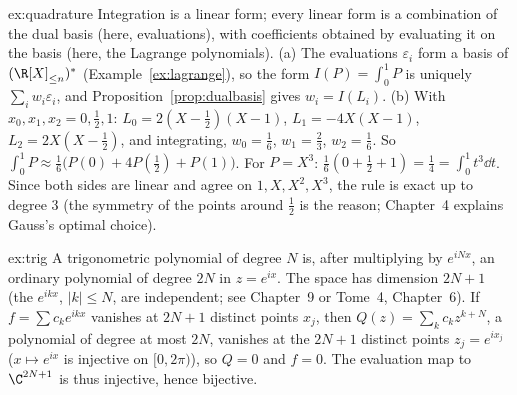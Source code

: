 \begin{solution}{ex:quadrature}
\idea Integration is a linear form; every linear form is a combination of the dual basis (here, evaluations), with
coefficients obtained by evaluating it on the basis (here, the Lagrange polynomials).
\writeup (a) The evaluations $\varepsilon_i$ form a basis of $(\R[X]_{\le n})^*$ (Example~\ref{ex:lagrange}), so the form
$I(P)=\int_0^1P$ is uniquely $\sum_iw_i\varepsilon_i$, and Proposition~\ref{prop:dualbasis} gives $w_i=I(L_i)$.
(b) With $x_0,x_1,x_2=0,\frac12,1$: $L_0=2(X-\frac12)(X-1)$, $L_1=-4X(X-1)$, $L_2=2X(X-\frac12)$, and integrating,
$w_0=\frac16$, $w_1=\frac23$, $w_2=\frac16$. So $\int_0^1P\approx\frac16\bigl(P(0)+4P(\frac12)+P(1)\bigr)$. For $P=X^3$:
$\frac16(0+\frac12+1)=\frac14=\int_0^1t^3\dd t$. Since both sides are linear and agree on $1,X,X^2,X^3$, the rule is exact
up to degree $3$ (the symmetry of the points around $\frac12$ is the reason; Chapter~4 explains Gauss's optimal choice).
\end{solution}

\begin{solution}{ex:trig}
\idea A trigonometric polynomial of degree $N$ is, after multiplying by $e^{iNx}$, an ordinary polynomial of degree $2N$
in $z=e^{ix}$.
\writeup The space has dimension $2N+1$ (the $e^{ikx}$, $|k|\le N$, are independent; see Chapter~9 or Tome~4,
Chapter~6). If $f=\sum c_ke^{ikx}$ vanishes at $2N+1$ distinct points $x_j$, then $Q(z)=\sum_kc_kz^{k+N}$, a polynomial of
degree at most $2N$, vanishes at the $2N+1$ distinct points $z_j=e^{ix_j}$ ($x\mapsto e^{ix}$ is injective on $[0,2\pi)$),
so $Q=0$ and $f=0$. The evaluation map to $\C^{2N+1}$ is thus injective, hence bijective.
\end{solution}


